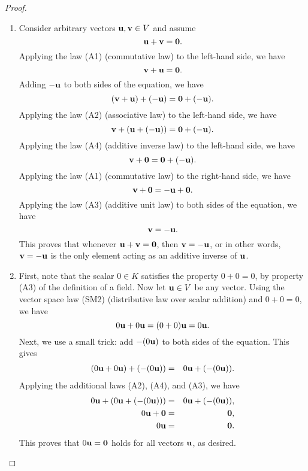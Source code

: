 \begin{proof}
\begin{enumerate}
  \item Consider arbitrary vectors $\mbox{\bf u},\mbox{\bf v}\in V$ and assume
    \begin{equation*}
      \mbox{\bf u}+\mbox{\bf v}=\mbox{\bf 0}.
    \end{equation*}
    Applying the law (A1) (commutative law) to the left-hand side, we
    have
    \begin{equation*}
      \mbox{\bf v}+\mbox{\bf u}=\mbox{\bf 0}.
    \end{equation*}
    Adding $-\mbox{\bf u}$ to both sides of the equation, we have
    \begin{equation*}
      (\mbox{\bf v}+\mbox{\bf u})+(-\mbox{\bf u}) = \mbox{\bf 0}+(-\mbox{\bf u}).
    \end{equation*}
    Applying the law (A2) (associative law) to the left-hand side, we
    have
    \begin{equation*}
      \mbox{\bf v}+(\mbox{\bf u}+(-\mbox{\bf u})) = \mbox{\bf 0}+(-\mbox{\bf u}).
    \end{equation*}
    Applying the law (A4) (additive inverse law) to the left-hand
    side, we have
    \begin{equation*}
      \mbox{\bf v}+\mbox{\bf 0} = \mbox{\bf 0}+(-\mbox{\bf u}).
    \end{equation*}
    Applying the law (A1) (commutative law) to the right-hand side, we
    have
    \begin{equation*}
      \mbox{\bf v}+\mbox{\bf 0} = -\mbox{\bf u} + \mbox{\bf 0}.
    \end{equation*}
    Applying the law (A3) (additive unit law) to both sides of the
    equation, we have
    \begin{equation*}
      \mbox{\bf v} = -\mbox{\bf u}.
    \end{equation*}
    This proves that whenever $\mbox{\bf u}+\mbox{\bf v}=\mbox{\bf 0}$, then
    $\mbox{\bf v} = -\mbox{\bf u}$, or in other words, $\mbox{\bf v} = -\mbox{\bf u}$
    is the only element acting as an additive inverse of $\mbox{\bf u}$.

  \item First, note that the scalar $0\in K$ satisfies the property
    $0+0=0$, by property (A3) of the definition of a field. Now let
    $\mbox{\bf u}\in V$ be any vector. Using the vector space law (SM2)
    (distributive law over scalar addition) and $0+0=0$, we have
    \begin{equation*}
      0\mbox{\bf u}+0\mbox{\bf u} = (0+0) \mbox{\bf u} = 0\mbox{\bf u}.
    \end{equation*}
    Next, we use a small trick: add $-(0\mbox{\bf u})$ to both sides of
    the equation. This gives
    \begin{eqnarray*}
      (0\mbox{\bf u}+0\mbox{\bf u})+(-(0\mbox{\bf u})) &=& 0\mbox{\bf u} + (-(0\mbox{\bf u})).
    \end{eqnarray*}
    Applying the additional laws (A2), (A4), and (A3), we have
    \begin{eqnarray*}
      0\mbox{\bf u}+(0\mbox{\bf u}+(-(0\mbox{\bf u}))) &=& 0\mbox{\bf u} + (-(0\mbox{\bf u})), \\
      0\mbox{\bf u} + \mbox{\bf 0} &=& \mbox{\bf 0}, \\
      0\mbox{\bf u} &=& \mbox{\bf 0}.
    \end{eqnarray*}
    This proves that $0\mbox{\bf u} = \mbox{\bf 0}$ holds for all vectors
    $\mbox{\bf u}$, as desired.


\end{enumerate}
\end{proof}
